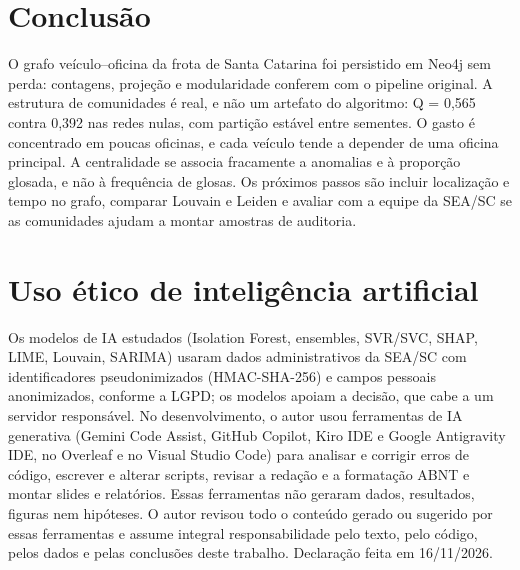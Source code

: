\documentclass[12pt,a4paper]{article}
\begin{document}
\section{Conclusão}
O grafo veículo–oficina da frota de Santa Catarina foi persistido em Neo4j sem perda: contagens, projeção e modularidade conferem com o pipeline original. A estrutura de comunidades é real, e não um artefato do algoritmo: Q = 0,565 contra 0,392 nas redes nulas, com partição estável entre sementes. O gasto é concentrado em poucas oficinas, e cada veículo tende a depender de uma oficina principal. A centralidade se associa fracamente a anomalias e à proporção glosada, e não à frequência de glosas. Os próximos passos são incluir localização e tempo no grafo, comparar Louvain e Leiden e avaliar com a equipe da SEA/SC se as comunidades ajudam a montar amostras de auditoria.

\section*{Uso ético de inteligência artificial}
Os modelos de IA estudados (Isolation Forest, ensembles, SVR/SVC, SHAP, LIME, Louvain, SARIMA) usaram dados administrativos da SEA/SC com identificadores pseudonimizados (HMAC-SHA-256) e campos pessoais anonimizados, conforme a LGPD; os modelos apoiam a decisão, que cabe a um servidor responsável. No desenvolvimento, o autor usou ferramentas de IA generativa (Gemini Code Assist, GitHub Copilot, Kiro IDE e Google Antigravity IDE, no Overleaf e no Visual Studio Code) para analisar e corrigir erros de código, escrever e alterar scripts, revisar a redação e a formatação ABNT e montar slides e relatórios. Essas ferramentas não geraram dados, resultados, figuras nem hipóteses. O autor revisou todo o conteúdo gerado ou sugerido por essas ferramentas e assume integral responsabilidade pelo texto, pelo código, pelos dados e pelas conclusões deste trabalho. Declaração feita em 16/11/2026.
\end{document}
